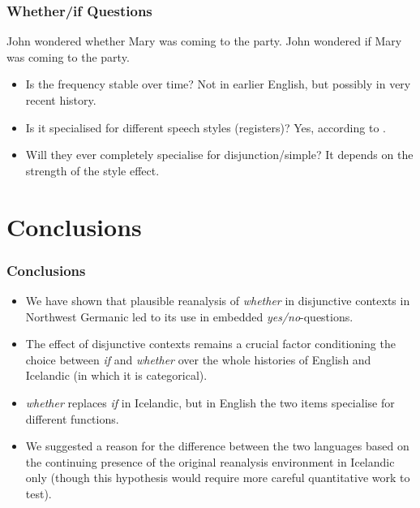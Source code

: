 \documentclass[hyperref={pdfpagelabels=false}]{beamer}
\begin{document}
\begin{frame}
\frametitle{Whether/if Questions}

\begin{exe}
		\ex John wondered whether Mary was coming to the party.
		\ex John wondered if Mary was coming to the party.
\end{exe}
\begin{itemize}
	\item Is the frequency stable over time? Not in earlier English, but possibly in very recent history.	
	\item Is it specialised for different speech styles (registers)? Yes, according to \citet{biberetal1999}.
	\item Will they ever completely specialise for disjunction/simple? It depends on the strength of the style effect.
\end{itemize}
\end{frame}

\section{Conclusions}
\begin{frame}
\frametitle{Conclusions}
\begin{itemize}
	\item We have shown that plausible reanalysis of \textsl{whether} in disjunctive contexts in Northwest Germanic led to its use in embedded \textsl{yes/no}-questions.
	\item The effect of disjunctive contexts remains a crucial factor conditioning the choice between \textsl{if} and \textsl{whether} over the whole histories of English and Icelandic (in which it is categorical).
	\item \textsl{whether} replaces \textsl{if} in Icelandic, but in English the two items specialise for different functions.
	\item We suggested a reason for the difference between the two languages based on the continuing presence of the original reanalysis environment in Icelandic only (though this hypothesis would require more careful quantitative work to test).
\end{itemize}
\end{frame}
\end{document}

